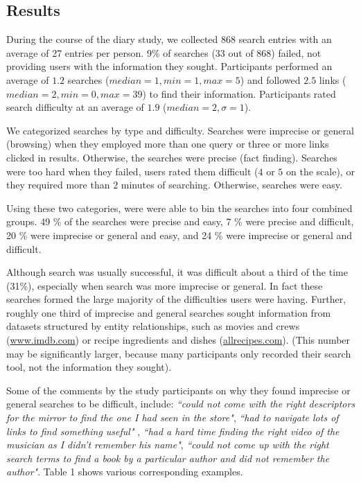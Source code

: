 \subsection{Results}

During the course of the diary study, we collected $868$ search entries with an average of 27 entries per person. 9\% of searches (33 out of 868) failed, not providing users with the information they sought. Participants performed an average of $1.2$ searches ($median=1, min =1, max=5$) and followed $2.5$ links ($median=2, min=0, max=39$) to find their information. Participants rated search difficulty at an average of $1.9$ ($median=2,  \sigma=1$). 

We categorized searches by type and difficulty. Searches were imprecise or general (browsing) when they employed more than one query or three or more links clicked in results. Otherwise, the searches were precise (fact finding). Searches were too hard when they failed, users rated them difficult ($4$ or $5$ on the scale), or they required more than $2$ minutes of searching. Otherwise, searches were easy. 

Using these two categories, were were able to bin the searches into four combined groups. 49 \% of the searches were precise and easy, 7 \% were precise and difficult, 20 \% were imprecise or general and easy, and 24 \% were imprecise or general and difficult. 

Although search was usually successful, it was difficult about a third of the time (31\%), especially when search was more imprecise or general. In fact these searches formed the large majority of the difficulties users were having. Further, roughly one third of imprecise and general searches sought information from datasets structured by entity relationships, such as movies and crews (\url{www.imdb.com}) or recipe ingredients and dishes (\url{allrecipes.com}). (This number may be significantly larger, because many participants only recorded their search tool, not the information they sought).

Some of the comments by the study participants on why they found imprecise or general searches to be difficult, include: \textit{``could not come with the right descriptors for the mirror to find the one I had seen in the store"}, \textit{``had to navigate lots of links to find something useful"} , \textit{``had a hard time finding the right video of the musician as I didn't remember his name"}, \textit{``could not come up with the right search terms to find a book by a particular author and did not remember the author"}. Table 1 shows various corresponding examples.

